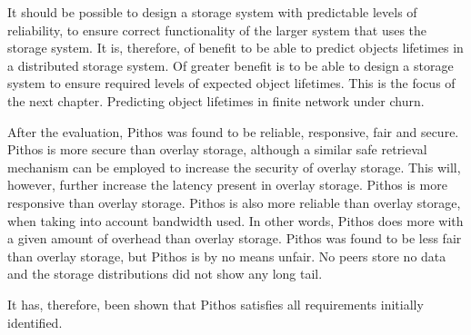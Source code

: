 It should be possible to design a storage system with predictable levels of reliability, to ensure correct functionality of the larger system that uses the storage system. It is, therefore, of benefit to be able to predict objects lifetimes in a distributed storage system. Of greater benefit is to be able to design a storage system to ensure required levels of expected object lifetimes. This is the focus of the next chapter. Predicting object lifetimes in finite network under churn.

After the evaluation, Pithos was found to be reliable, responsive, fair and secure. Pithos is more secure than overlay storage, although a similar safe retrieval mechanism can be employed to increase the security of overlay storage. This will, however, further increase the latency present in overlay storage. Pithos is more responsive than overlay storage. Pithos is also more reliable than overlay storage, when taking into account bandwidth used. In other words, Pithos does more with a given amount of overhead than overlay storage. Pithos was found to be less fair than overlay storage, but Pithos is by no means unfair. No peers store no data and the storage distributions did not show any long tail.

It has, therefore, been shown that Pithos satisfies all requirements initially identified.
